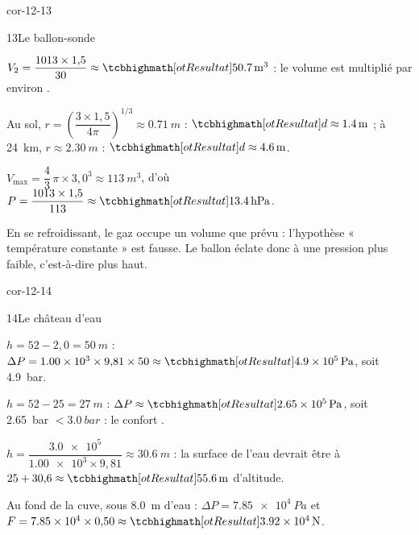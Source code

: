 \begin{blocLivre}{cor-12-13}
\begin{corrige}{13}{Le ballon-sonde}
\begin{questions}
\item $V_2=\dfrac{1013\times1{,}5}{30}\approx\res{\qty{50,7}{m^3}}$ : le volume est multiplié par environ .
\item Au sol, $r=\left(\dfrac{3\times1{,}5}{4\pi}\right)^{1/3}\approx\qty{0,71}{m}$ : $\res{d\approx\qty{1,4}{m}}$ ; à \qty{24}{km}, $r\approx\qty{2,30}{m}$ : $\res{d\approx\qty{4,6}{m}}$.
\item $V_\mathrm{max}=\dfrac{4}{3}\,\pi\times3{,}0^3\approx\qty{113}{m^3}$, d'où $P=\dfrac{1013\times1{,}5}{113}\approx\res{\qty{13,4}{hPa}}$.
\item En se refroidissant, le gaz occupe un volume  que prévu : l'hypothèse « température constante » est
fausse. Le ballon éclate donc à une pression plus faible, c'est-à-dire plus haut.
\end{questions}
\end{corrige}
\end{blocLivre}
\begin{blocLivre}{cor-12-14}
\begin{corrige}{14}{Le château d'eau}
\begin{questions}
\item $h=52-2{,}0=\qty{50}{m}$ : $\Delta P=\num{1,00e3}\times9{,}81\times50\approx\res{\qty{4,9e5}{Pa}}$, soit \qty{4,9}{bar}.
\item $h=52-25=\qty{27}{m}$ : $\Delta P\approx\res{\qty{2,65e5}{Pa}}$, soit \qty{2,65}{bar} $<\qty{3,0}{bar}$ : le confort .
\item $h=\dfrac{\num{3,0e5}}{\num{1,00e3}\times9{,}81}\approx\qty{30,6}{m}$ : la surface de l'eau devrait être à $25+30{,}6\approx\res{\qty{55,6}{m}}$ d'altitude.
\item Au fond de la cuve, sous \qty{8,0}{m} d'eau : $\Delta P=\qty{7,85e4}{Pa}$ et $F=\num{7,85e4}\times0{,}50\approx\res{\qty{3,92e4}{N}}$.
\end{questions}
\end{corrige}
\end{blocLivre}
